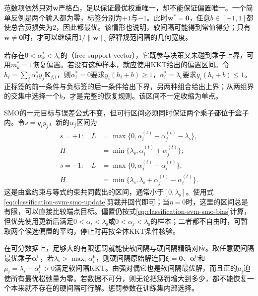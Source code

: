 范数项依然只对$\bm{w}$严格凸，足以保证最优权重唯一，却不能保证偏置唯一。一个简单反例是两个输入都为零，标签分别为$+1$与$-1$。此时$\bm{w}^{\ast}=\bm{0}$，任意$b\in[-1,1]$都使总合页损失为$2$，因此都最优。该情形也说明，软间隔可能得到常值得分；只有$\bm{w}\ne\bm{0}$时，才可以继续用$1/\lVert\bm{w}\rVert_2$解释规范间隔的几何宽度。

若存在$0<\alpha_k^{\ast}<\lambda_{\mathrm{s}}$的（free support vector），它既参与决策又未碰到乘子上界，可用$m_k^{\ast}=1$恢复偏置。若没有这种样本，就应使用KKT给出的偏置区间。令$h_i=\sum_j\alpha_j^{\ast}y_j\bm{K}_{j,i}$，则$\alpha_i^{\ast}=0$要求$y_i(h_i+b)\ge1$，$\alpha_i^{\ast}=\lambda_{\mathrm{s}}$要求$y_i(h_i+b)\le1$。正标签的前一条件与负标签的后一条件给出下界，另两种组合给出上界；从两组界的交集中选择一个$b$，才是完整的恢复规则。该区间不一定收缩为单点。

SMO的一元目标与误差公式不变，但可行区间必须同时保证两个乘子都位于盒子内。令$s=y_i y_j$，新的$\alpha_j$区间为
\begin{equation}
  \begin{aligned}
    s=+1:\quad
    L&=\max\{0,\alpha_i^{(t)}+\alpha_j^{(t)}
                    -\lambda_{\mathrm{s}}\},\\
    H&=\min\{\lambda_{\mathrm{s}},
                    \alpha_i^{(t)}+\alpha_j^{(t)}\};\\
    s=-1:\quad
    L&=\max\{0,\alpha_j^{(t)}-\alpha_i^{(t)}\},\\
    H&=\min\{\lambda_{\mathrm{s}},
           \lambda_{\mathrm{s}}+\alpha_j^{(t)}-\alpha_i^{(t)}\}.
  \end{aligned}
  \label{eq:classification-svm-smo-soft-interval}
\end{equation}
这是由盒约束与等式约束共同截出的区间，通常小于$[0,\lambda_{\mathrm{s}}]$。使用式\eqref{eq:classification-svm-smo-update}剪裁并回代即可；当$\eta=0$时，这里的区间总是有限，可以直接比较端点目标。偏置仍按式\eqref{eq:classification-svm-smo-bias}计算，但优先使用更新后满足$0<\alpha_i<\lambda_{\mathrm{s}}$或$0<\alpha_j<\lambda_{\mathrm{s}}$的样本；二者都不自由时，可暂取两个候选偏置的平均，停止时再按全体KKT条件核验。

在可分数据上，足够大的有限惩罚就能使软间隔与硬间隔精确对应。取任意硬间隔最优乘子$\bm{\alpha}^{\mathrm{h}}$，若$\lambda_{\mathrm{s}}>\max_i\alpha_i^{\mathrm{h}}$，则硬间隔原始解连同$\bm{\xi}=\bm{0}$、$\bm{\alpha}^{\mathrm{h}}$和$\mu_i=\lambda_{\mathrm{s}}-\alpha_i^{\mathrm{h}}>0$满足软间隔KKT。由强对偶它也是软间隔最优解，而且正的$\mu_i$迫使所有最优松弛量为零。若数据不可分，则无论把惩罚增大到多少，都不能恢复一个本来就不存在的硬间隔可行解。惩罚参数在训练集内部选择。

